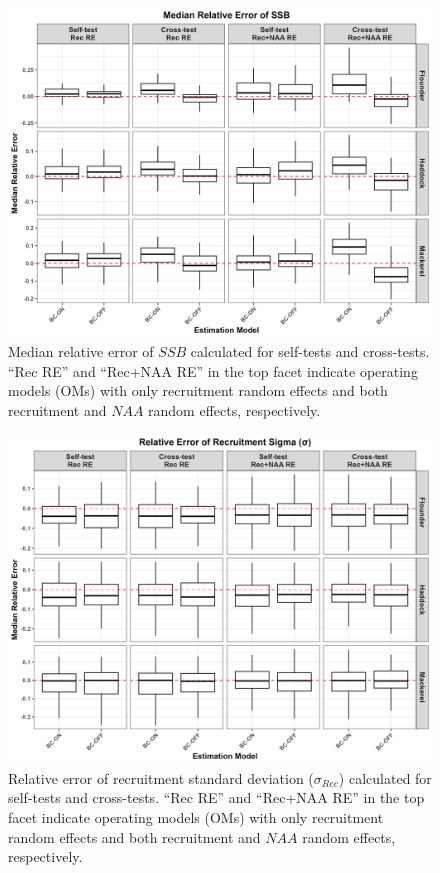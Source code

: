 \documentclass[
  12pt,
]{article}
\begin{document}
\begin{figure}[H]
\centering
\includegraphics[width=\textwidth]{Revised_Figures&Tables/Median_SSB.PNG}
\caption{Median relative error of $SSB$ calculated for self-tests and cross-tests. ``Rec RE'' and ``Rec+NAA RE'' in the top facet indicate operating models (OMs) with only recruitment random effects and both recruitment and $NAA$ random effects, respectively.}
\label{fig:Median_SSB}
\end{figure}

\begin{figure}[H]
\centering
\includegraphics[width=\textwidth]{Revised_Figures&Tables/Rec_sigma.PNG}
\caption{Relative error of recruitment standard deviation ($\sigma_{Rec}$) calculated for self-tests and cross-tests. ``Rec RE'' and ``Rec+NAA RE'' in the top facet indicate operating models (OMs) with only recruitment random effects and both recruitment and $NAA$ random effects, respectively.}
\label{fig:Rec_sigma}
\end{figure}
\end{document}
